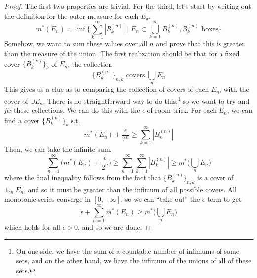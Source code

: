   \begin{proof}
    The first two properties are trivial. For the third, let's start by writing out the definition for the outer measure for each $E_n$. 
    \begin{equation}
      m^\ast (E_n) \coloneqq \inf \bigg\{ \sum_{k=1}^\infty |B_k^{(n)}| \;\bigg|\; E_n \subset \bigcup_{k=1}^\infty B_k^{(n)}, B_k^{(n)} \text{ boxes} \bigg\}
    \end{equation}
    Somehow, we want to sum these values over all $n$ and prove that this is greater than the measure of the union. The first realization should be that for a fixed cover $\{B_k^{(n)}\}_k$ of $E_n$, the collection 
    \begin{equation}
      \{B_k^{(n)}\}_{n, k} \text{ covers } \bigcup_{n} E_n
    \end{equation} 
    This gives us a clue as to comparing the collection of covers of each $E_n$, with the cover of $\cup E_n$. There is no straightforward way to do this,\footnote{On one side, we have the sum of a countable number of infimums of some sets, and on the other hand, we have the infimum of the unions of all of these sets.} so we want to try and \textit{fix} these collections. We can do this with the $\epsilon$ of room trick. For each $E_n$, we can find a cover $\{B_k^{(n)}\}_k$ s.t. 
    \begin{equation}
      m^\ast (E_n) + \frac{\epsilon}{2^n} \geq \sum_{k=1}^\infty |B_k^{(n)}| 
    \end{equation}
    Then, we can take the infinite sum. 
    \begin{equation}
      \sum_{n=1}^\infty \bigg( m^\ast (E_n) + \frac{\epsilon}{2^n} \bigg) \geq \sum_{n=1}^\infty \sum_{k=1}^\infty |B_k^{(n)}| \geq m^\ast \bigg( \bigcup_n E_n \bigg)
    \end{equation} 
    where the final inequality follows from the fact that $\{B_k^{(n)}\}_{n, k}$ is a cover of $\cup_n E_n$, and so it must be greater than the infimum of all possible covers. All monotonic series converge in $[0, +\infty]$, so we can ``take out'' the $\epsilon$ term to get 
    \begin{equation}
      \epsilon + \sum_{n=1}^\infty m^\ast (E_n) \geq m^\ast \bigg( \bigcup_n E_n \bigg)
    \end{equation}
    which holds for all $\epsilon > 0$, and so we are done. 
  \end{proof}

